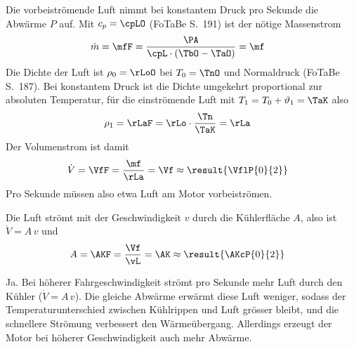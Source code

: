 \begin{abcliste}
\abc Die vorbeiströmende Luft nimmt bei konstantem Druck pro Sekunde die Abwärme $P$ auf. Mit $c_p = \cpLO$ (FoTaBe S.~191) ist der nötige Massenstrom
\begin{align}
 \dot m &= \mfF = \frac{\PA}{\cpL\cdot\left(\TbO-\TaO\right)} = \mf
\end{align}
Die Dichte der Luft ist $\rho_0 = \rLoO$ bei $T_0 = \TnO$ und Normaldruck (FoTaBe S.~187). Bei konstantem Druck ist die Dichte umgekehrt proportional zur absoluten Temperatur, für die einströmende Luft mit $T_1 = T_0+\vartheta_1 = \TaK$ also
\begin{align}
 \rho_1 &= \rLaF = \rLo\cdot\frac{\Tn}{\TaK} = \rLa
\end{align}
Der Volumenstrom ist damit
\begin{align}
 \dot V &= \VfF = \frac{\mf}{\rLa} = \Vf \approx \result{\VflP{0}{2}}
\end{align}
Pro Sekunde müssen also etwa  Luft am Motor vorbeiströmen.

\abc Die Luft strömt mit der Geschwindigkeit $v$ durch die Kühlerfläche $A$, also ist $\dot V = A\,v$ und
\begin{align}
 A &= \AKF = \frac{\Vf}{\vL} = \AK \approx \result{\AKcP{0}{2}}
\end{align}

\abc Ja. Bei höherer Fahrgeschwindigkeit strömt pro Sekunde mehr Luft durch den Kühler ($\dot V = A\,v$). Die gleiche Abwärme erwärmt diese Luft weniger, sodass der Temperaturunterschied zwischen Kühlrippen und Luft grösser bleibt, und die schnellere Strömung verbessert den Wärmeübergang. Allerdings erzeugt der Motor bei höherer Geschwindigkeit auch mehr Abwärme.
\end{abcliste}
